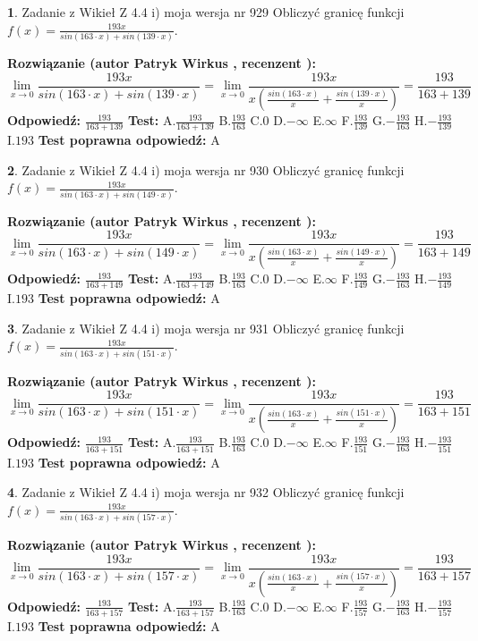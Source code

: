 \documentclass[12pt, a4paper]{article}
\theoremstyle{definition} %
\newtheorem{zad}{}
\newcommand{\zadStart}[1]{\begin{zad}#1\newline}
\newcommand{\zadStop}{\end{zad}}
\newcommand{\rozwStart}[2]{\noindent \textbf{Rozwiązanie (autor #1 , recenzent #2): }\newline}
\newcommand{\rozwStop}{\newline}
\newcommand{\odpStart}{\noindent \textbf{Odpowiedź:}\newline}
\newcommand{\odpStop}{\newline}
\newcommand{\testStart}{\noindent \textbf{Test:}\newline}
\newcommand{\testStop}{\newline}
\newcommand{\kluczStart}{\noindent \textbf{Test poprawna odpowiedź:}\newline}
\newcommand{\kluczStop}{\newline}
\begin{document}
\zadStart{Zadanie z Wikieł Z 4.4 i) moja wersja nr 929}
Obliczyć granicę funkcji $f(x)=\frac{193x}{sin(163\cdot x) +sin(139\cdot x)}$.
\zadStop
\rozwStart{Patryk Wirkus}{}
$$\lim\limits_{x\to 0}\frac{193x}{sin(163\cdot x) +sin(139\cdot x)}=\lim\limits_{x\to 0}\frac{193x}{x(\frac{sin(163\cdot x)}{x}+\frac{sin(139\cdot x)}{x})}=\frac{193}{163+139}$$
\rozwStop
\odpStart
$\frac{193}{163+139}$
\odpStop
\testStart
A.$\frac{193}{163+139}$
B.$\frac{193}{163}$
C.$0$
D.$-\infty$
E.$\infty$
F.$\frac{193}{139}$
G.$-\frac{193}{163}$
H.$-\frac{193}{139}$
I.$193$
\testStop
\kluczStart
A
\kluczStop



\zadStart{Zadanie z Wikieł Z 4.4 i) moja wersja nr 930}
Obliczyć granicę funkcji $f(x)=\frac{193x}{sin(163\cdot x) +sin(149\cdot x)}$.
\zadStop
\rozwStart{Patryk Wirkus}{}
$$\lim\limits_{x\to 0}\frac{193x}{sin(163\cdot x) +sin(149\cdot x)}=\lim\limits_{x\to 0}\frac{193x}{x(\frac{sin(163\cdot x)}{x}+\frac{sin(149\cdot x)}{x})}=\frac{193}{163+149}$$
\rozwStop
\odpStart
$\frac{193}{163+149}$
\odpStop
\testStart
A.$\frac{193}{163+149}$
B.$\frac{193}{163}$
C.$0$
D.$-\infty$
E.$\infty$
F.$\frac{193}{149}$
G.$-\frac{193}{163}$
H.$-\frac{193}{149}$
I.$193$
\testStop
\kluczStart
A
\kluczStop



\zadStart{Zadanie z Wikieł Z 4.4 i) moja wersja nr 931}
Obliczyć granicę funkcji $f(x)=\frac{193x}{sin(163\cdot x) +sin(151\cdot x)}$.
\zadStop
\rozwStart{Patryk Wirkus}{}
$$\lim\limits_{x\to 0}\frac{193x}{sin(163\cdot x) +sin(151\cdot x)}=\lim\limits_{x\to 0}\frac{193x}{x(\frac{sin(163\cdot x)}{x}+\frac{sin(151\cdot x)}{x})}=\frac{193}{163+151}$$
\rozwStop
\odpStart
$\frac{193}{163+151}$
\odpStop
\testStart
A.$\frac{193}{163+151}$
B.$\frac{193}{163}$
C.$0$
D.$-\infty$
E.$\infty$
F.$\frac{193}{151}$
G.$-\frac{193}{163}$
H.$-\frac{193}{151}$
I.$193$
\testStop
\kluczStart
A
\kluczStop



\zadStart{Zadanie z Wikieł Z 4.4 i) moja wersja nr 932}
Obliczyć granicę funkcji $f(x)=\frac{193x}{sin(163\cdot x) +sin(157\cdot x)}$.
\zadStop
\rozwStart{Patryk Wirkus}{}
$$\lim\limits_{x\to 0}\frac{193x}{sin(163\cdot x) +sin(157\cdot x)}=\lim\limits_{x\to 0}\frac{193x}{x(\frac{sin(163\cdot x)}{x}+\frac{sin(157\cdot x)}{x})}=\frac{193}{163+157}$$
\rozwStop
\odpStart
$\frac{193}{163+157}$
\odpStop
\testStart
A.$\frac{193}{163+157}$
B.$\frac{193}{163}$
C.$0$
D.$-\infty$
E.$\infty$
F.$\frac{193}{157}$
G.$-\frac{193}{163}$
H.$-\frac{193}{157}$
I.$193$
\testStop
\kluczStart
A
\kluczStop
\end{document}
